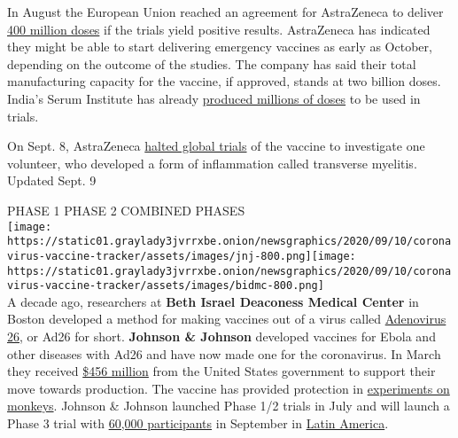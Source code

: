 In August the European Union reached an agreement for AstraZeneca to
deliver
\href{https://www.astrazeneca.com/content/astraz/media-centre/press-releases/2020/astrazeneca-concludes-agreement-with-the-european-commission-for-the-supply-of-up-to-400-million-doses-of-azd1222-covid-19-vaccine.html}{400
million doses} if the trials yield positive results. AstraZeneca has
indicated they might be able to start delivering emergency vaccines as
early as October, depending on the outcome of the studies. The company
has said their total manufacturing capacity for the vaccine, if
approved, stands at two billion doses. India's Serum Institute has
already
\href{https://www.nytimes3xbfgragh.onion/2020/08/01/world/asia/coronavirus-vaccine-india.html}{produced
millions of doses} to be used in trials.

On Sept. 8, AstraZeneca
\href{https://www.nytimes3xbfgragh.onion/2020/09/08/world/covid-19-coronavirus.html\#link-4a08b4d4}{halted
global trials} of the vaccine to investigate one volunteer, who
developed a form of inflammation called transverse myelitis.\\
Updated Sept. 9

PHASE 1 PHASE 2 COMBINED PHASES\\
\texttt{[image: https://static01.graylady3jvrrxbe.onion/newsgraphics/2020/09/10/coronavirus-vaccine-tracker/assets/images/jnj-800.png]}\texttt{[image: https://static01.graylady3jvrrxbe.onion/newsgraphics/2020/09/10/coronavirus-vaccine-tracker/assets/images/bidmc-800.png]}\\
A decade ago, researchers at \textbf{\textbf{Beth Israel Deaconess
Medical Center}} in Boston developed a method for making vaccines out of
a virus called
\href{https://www.nytimes3xbfgragh.onion/2020/07/17/health/coronavirus-vaccine-johnson-janssen.html}{Adenovirus
26}, or Ad26 for short. \textbf{\textbf{Johnson \& Johnson}} developed
vaccines for Ebola and other diseases with Ad26 and have now made one
for the coronavirus. In March they received
\href{https://www.jnj.com/johnson-johnson-announces-a-lead-vaccine-candidate-for-covid-19-landmark-new-partnership-with-u-s-department-of-health-human-services-and-commitment-to-supply-one-billion-vaccines-worldwide-for-emergency-pandemic-use}{\$456
million} from the United States government to support their move towards
production. The vaccine has provided protection in
\href{https://www.nytimes3xbfgragh.onion/2020/07/30/health/covid-19-vaccine-monkeys.html}{experiments
on monkeys}. Johnson \& Johnson launched Phase 1/2 trials in July and
will launch a Phase 3 trial with
\href{https://clinicaltrials.gov/ct2/show/NCT04505722?term=vaccine\&recrs=abdf\&cond=COVID-19\&phase=0123\&sort=nwst\&draw=2\&rank=11}{60,000
participants} in September in
\href{https://www.reuters.com/article/us-health-coronavirus-chile-vaccine-idUSKBN25M297}{Latin
America}.

